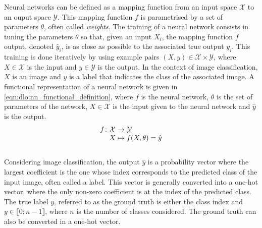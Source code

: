 Neural networks can be defined as a mapping function from an input space
$\mathcal{X}$ to an ouput space $\mathcal{Y}$. This mapping function $f$ is
parametrised by a set of parameters $\theta$, often called \emph{weights}. The
training of a neural network consists in tuning the parameters $\theta$ so that,
given an input $X_i$, the mapping function $f$ output, denoted $\hat{y}_i$, is
as close as possible to the associated true output $y_i$. This training is done
iteratively by using example pairs $(X, y) \in \mathcal{X} \times \mathcal{Y}$,
where $X\in\mathcal{X}$ is the input and $y\in\mathcal{Y}$ is the output. In the
context of image classification, $X$ is an image and $y$ is a label that
indicates the class of the associated image. A functional representation of a
neural network is given in \cref{eqn:dlo:nn_functional_definition}, where $f$ is
the neural network, $\theta$ is the set of parameters of the network,
$X\in\mathcal{X}$ is the input given to the neural network and $\hat{y}$ is the
output.\\

\begin{equation}
  \label{eqn:dlo:nn_functional_definition}
  \begingroup
  \setlength\arraycolsep{0pt}
  f \colon\begin{array}[t]{c >{{}}c<{{}} l}
    \mathcal{X} & \to     & \mathcal{Y} \\
    X                     & \mapsto & f(X, \theta) = \hat{y}
  \end{array}
  \endgroup
\end{equation}\\


Considering image classification,  the output $\hat{y}$ is a probability vector
where the largest coefficient is the one whose index corresponds to the
predicted class of the input image, often called a label. This vector is
generally converted into a one-hot vector, where the only non-zero coefficient is
at the index of the predicted class. The true label $y$, referred to as the
ground truth is either the class index and $y\in\llbracket0;n-1\rrbracket$,
where $n$ is the number of classes considered. The ground truth can also be
converted in a one-hot vector.\\


